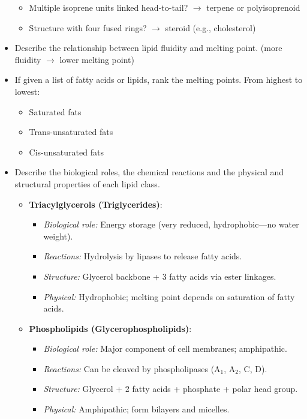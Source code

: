 \documentclass[letterpaper, 12pt]{article}
\begin{document}
\begin{itemize}
\begin{itemize}
\item Multiple isoprene units linked head-to-tail? $\to$ terpene or polyisoprenoid
\item Structure with four fused rings? $\to$ steroid (e.g., cholesterol)
\end{itemize}
\item Describe the relationship between lipid fluidity and melting point. (more fluidity $\to$ lower melting point)
\item  If given a list of fatty acids or lipids, rank the melting points. From highest to lowest:
\begin{itemize}
\item Saturated fats
\item Trans-unsaturated fats
\item Cis-unsaturated fats
\end{itemize}
\item  Describe the biological roles, the chemical reactions and the physical and structural properties of each lipid class.
\begin{itemize}
    \item \textbf{Triacylglycerols (Triglycerides)}:
    \begin{itemize}
        \item \textit{Biological role:} Energy storage (very reduced, hydrophobic—no water weight).
        \item \textit{Reactions:} Hydrolysis by lipases to release fatty acids.
        \item \textit{Structure:} Glycerol backbone + 3 fatty acids via ester linkages.
        \item \textit{Physical:} Hydrophobic; melting point depends on saturation of fatty acids.
    \end{itemize}
    
    \item \textbf{Phospholipids (Glycerophospholipids)}:
    \begin{itemize}
        \item \textit{Biological role:} Major component of cell membranes; amphipathic.
        \item \textit{Reactions:} Can be cleaved by phospholipases (A$_1$, A$_2$, C, D).
        \item \textit{Structure:} Glycerol + 2 fatty acids + phosphate + polar head group.
        \item \textit{Physical:} Amphipathic; form bilayers and micelles.
    \end{itemize}


\end{itemize}
\end{itemize}
\end{document}
